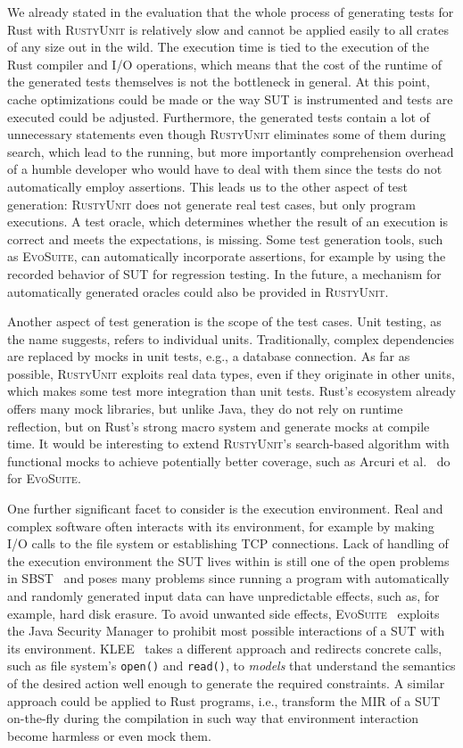 \documentclass[paper=a4,%
  twoside,%
  BCOR4mm,%
  abstract=true,%
  toc=bibliography,%
  chapterprefix=true,%
  toc=bibliographynumbered,%
  open=right,%
  english,%
  pagesize=pdftex]{scrreprt}
\newcommand{\tech}{\textsc{RustyUnit}\xspace}
\newcommand{\mir}{\ac{MIR}\xspace}
\newcommand{\sut}{\ac{SUT}\xspace}
\begin{document}
We already stated in the evaluation that the whole process of generating tests for Rust with \tech is relatively slow and cannot be applied easily to all crates of any size out in the wild. The execution time is tied to the execution of the Rust compiler and I/O operations, which means that the cost of the runtime of the generated tests themselves is not the bottleneck in general. At this point, cache optimizations could be made or the way \sut is instrumented and tests are executed could be adjusted. Furthermore, the generated tests contain a lot of unnecessary statements even though \tech eliminates some of them during search, which lead to the running, but more importantly comprehension overhead of a humble developer who would have to deal with them since the tests do not automatically employ assertions. This leads us to the other aspect of test generation: \tech does not generate real test cases, but only program executions. A test oracle, which determines whether the result of an execution is correct and meets the expectations, is missing. Some test generation tools, such as \textsc{EvoSuite}, can automatically incorporate assertions, for example by using the recorded behavior of \sut for regression testing. In the future, a mechanism for automatically generated oracles could also be provided in \tech.

Another aspect of test generation is the scope of the test cases. Unit testing, as the name suggests, refers to individual units. Traditionally, complex dependencies are replaced by mocks in unit tests, e.g., a database connection. As far as possible, \tech exploits real data types, even if they originate in other units, which makes some test more integration than unit tests. Rust's ecosystem already offers many mock libraries, but unlike Java, they do not rely on runtime reflection, but on Rust's strong macro system and generate mocks at compile time. It would be interesting to extend \tech's search-based algorithm with functional mocks to achieve potentially better coverage, such as Arcuri et al.~\cite{Arcuri2017} do for \textsc{EvoSuite}.

One further significant facet to consider is the execution environment. Real and complex software often interacts with its environment, for example by making I/O calls to the file system or establishing \ac{TCP} connections. Lack of handling of the execution environment the \sut lives within is still one of the open problems in \ac{SBST}~\cite{McMinn2011} and poses many problems since running a program with automatically and randomly generated input data can have unpredictable effects, such as, for example, hard disk erasure. To avoid unwanted side effects, \textsc{EvoSuite}~\cite{Fraser2013a} exploits the Java Security Manager to prohibit most possible interactions of a \sut with its environment. \textsc{KLEE}~\cite{cadar2008klee} takes a different approach and redirects concrete calls, such as file system's \texttt{open()} and \texttt{read()}, to \emph{models} that understand the semantics of the desired action well enough to generate the required constraints. A similar approach could be applied to Rust programs, i.e., transform the \mir of a \sut on-the-fly during the compilation in such way that environment interaction become harmless or even mock them.
\end{document}
